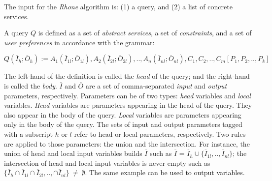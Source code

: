 
The input for the \textit{Rhone} algorithm is: (1) a query, and (2) a list of
concrete services.

\begin{definition}[query]
A query $Q$ is defined as a set of \textit{abstract services}, a set of \textit{constraints}, and a set of \textit{user preferences} in accordance with the grammar:
%
\begin{center}
\small
\begin{math}
Q (\overline{I}_{h}; \overline{O}_{h}) := A_{1}(\overline{I}_{1l};
\overline{O}_{1l}), A_{2}(\overline{I}_{2l}; \overline{O}_{2l}), ..,  A_{n}(\overline{I}_{nl}; \overline{O}_{nl}),C_{1},C_{2}, .., C_{m}[P_{1},P_{2}, .., P_{k}]
\end{math}
\end{center}
%
The left-hand of the definition is called the \textit{head} of the query; and the right-hand is called the \textit{body}. 
%
$\overline{I}$ and $\overline{O}$ are a set of comma-separated \textit{input} and \textit{output} parameters, respectively.
%
Parameters can be of two types: \textit{head} variables and \textit{local} variables.
\textit{Head} variables are parameters appearing in the head of the query. They
also appear in the body of the query.
\textit{Local} variables are parameters appearing only in the body of the query.
%
The sets of input and output parameters tagged with a subscript $h$ or $l$ refer to head or local parameters, respectively.
Two rules are applied to those parameters: the union and the intersection. 
For instance, the union of head and local input variables builds $\overline{I}$ such as  
$\overline{I}$ =  $\overline{I}_{h} \cup \lbrace\overline{I}_{1l},..,\overline{I}_{nl}\rbrace$; 
the intersection of head and local input variables is never empty such as $\lbrace\overline{I}_{h} \cap \overline{I}_{1l} \cap \overline{I}_{2l},.., \cap \overline{I}_{nl}\rbrace \ \neq \ \emptyset$. 
The same example can be used to output variables.
% 


\end{definition}
